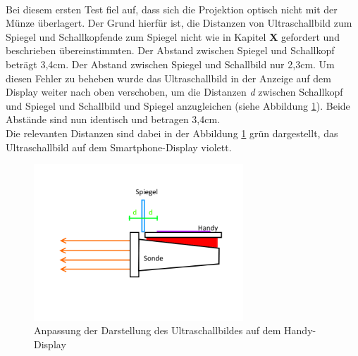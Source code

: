 ~\\
Bei diesem ersten Test fiel auf, dass sich die Projektion optisch nicht mit der Münze überlagert. Der Grund hierfür ist, die Distanzen von Ultraschallbild zum Spiegel und Schallkopfende zum Spiegel nicht wie in Kapitel \textbf{X} gefordert und beschrieben übereinstimmten. Der Abstand zwischen Spiegel und Schallkopf beträgt 3,4cm. Der Abstand zwischen Spiegel und Schallbild nur 2,3cm. Um diesen Fehler zu beheben wurde das Ultraschallbild in der Anzeige auf dem Display weiter nach oben verschoben, um die Distanzen \textit{d} zwischen Schallkopf und Spiegel und Schallbild und Spiegel anzugleichen (siehe Abbildung \ref{fig:Prototyp_Evaluierung}). Beide Abstände sind nun identisch und betragen 3,4cm.
\\
Die relevanten Distanzen sind dabei in der Abbildung \ref{fig:Prototyp_Evaluierung} grün dargestellt, das Ultraschallbild auf dem Smartphone-Display violett.
\clearpage
\begin{figure}[h]
	\centering
	\includegraphics*[width=0.7\textwidth]{Bilder/Evaluation/Prototyp.png}
	\caption{Anpassung der Darstellung des Ultraschallbildes auf dem Handy-Display}
	\label{fig:Prototyp_Evaluierung}
\end{figure}

